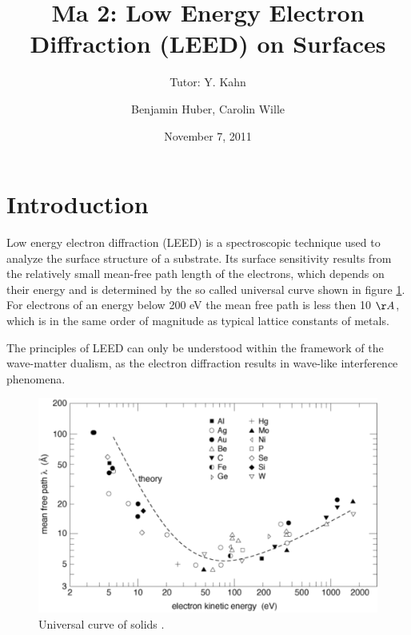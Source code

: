 \documentclass[a4paper]{scrartcl}
\title{Ma 2: Low Energy Electron Diffraction (LEED) on Surfaces}
\subtitle{Tutor: Y. Kahn}
\author{Benjamin Huber, Carolin Wille}
\date{November 7, 2011}
\numberwithin{equation}{section}
\numberwithin{figure}{section}
\numberwithin{table}{section}
\begin{document}
\thispagestyle{empty}
\maketitle
\tableofcontents
\clearpage


\section{Introduction}
Low energy electron diffraction (LEED) is a spectroscopic technique used to analyze the surface structure of a substrate. Its surface sensitivity results from the relatively small mean-free path length of the electrons, which depends on their energy and is determined by the so called universal curve shown in figure \ref{fig:uni}. For electrons of an energy below 200 eV the mean free path is less then 10 $\AA$, which is in the same order of magnitude as typical lattice constants of metals. 

The principles of LEED can only be understood within the framework of the wave-matter dualism, as the electron diffraction results in wave-like interference phenomena.


\begin{figure}
  \centering
   	\includegraphics[width=\linewidth]{pic/meanfree.pdf}

 \caption{\small Universal curve of solids \cite{zangwill}.  }
        \label{fig:uni}
\end{figure}
\FloatBarrier
\end{document}
